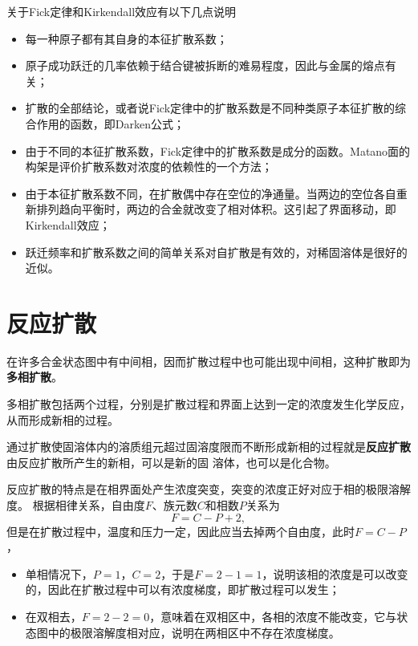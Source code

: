             关于Fick定律和Kirkendall效应有以下几点说明
            \begin{itemize}
                \item 每一种原子都有其自身的本征扩散系数；
                \item 原子成功跃迁的几率依赖于结合键被拆断的难易程度，因此与金属的熔点有关；
                \item 扩散的全部结论，或者说Fick定律中的扩散系数是不同种类原子本征扩散的综合作用的函数，即Darken公式；
                \item 由于不同的本征扩散系数，Fick定律中的扩散系数是成分的函数。Matano面的构架是评价扩散系数对浓度的依赖性的一个方法；
                \item 由于本征扩散系数不同，在扩散偶中存在空位的净通量。当两边的空位各自重新排列趋向平衡时，两边的合金就改变了相对体积。这引起了界面移动，即Kirkendall效应；
                \item 跃迁频率和扩散系数之间的简单关系对自扩散是有效的，对稀固溶体是很好的近似。
            \end{itemize}
    \section{反应扩散}
        在许多合金状态图中有中间相，因而扩散过程中也可能出现中间相，这种扩散即为\textbf{多相扩散}。

        多相扩散包括两个过程，分别是扩散过程和界面上达到一定的浓度发生化学反应，从而形成新相的过程。

        通过扩散使固溶体内的溶质组元超过固溶度限而不断形成新相的过程就是\textbf{反应扩散}由反应扩散所产生的新相，可以是新的固
        溶体，也可以是化合物。

        反应扩散的特点是在相界面处产生浓度突变，突变的浓度正好对应于相的极限溶解度。
        根据相律关系，自由度$F$、族元数$C$和相数$P$关系为
        \begin{equation}
            F=C-P+2,
        \end{equation}
        但是在扩散过程中，温度和压力一定，因此应当去掉两个自由度，此时$F=C-P$，
        \begin{itemize}
            \item 单相情况下，$P=1$，$C=2$，于是$F=2-1=1$，说明该相的浓度是可以改变的，因此在扩散过程中可以有浓度梯度，即扩散过程可以发生；
            \item 在双相去，$F=2-2=0$，意味着在双相区中，各相的浓度不能改变，它与状态图中的极限溶解度相对应，说明在两相区中不存在浓度梯度。
        \end{itemize}
        
